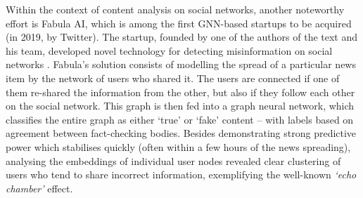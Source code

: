 Within the context of content analysis on social networks, another noteworthy effort is Fabula AI, which is among the first GNN-based startups to be acquired (in 2019, by Twitter). The startup, founded by one of the authors of the text and his team, developed novel technology for detecting misinformation on social networks \citep{monti2019fake}. Fabula's solution consists of modelling the spread of a particular news item by the network of users who shared it. The users are connected if one of them re-shared the information from the other, but also if they follow each other on the social network. This graph is then fed into a graph neural network, which classifies the entire graph as either `true' or `fake' content -- with labels based on agreement between fact-checking bodies. Besides demonstrating strong predictive power which stabilises quickly (often within a few hours of the news spreading), analysing the embeddings of individual user nodes revealed clear clustering of users who tend to share incorrect information, exemplifying the well-known \emph{`echo chamber'} effect.

